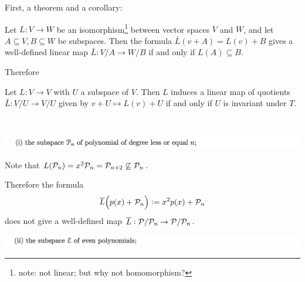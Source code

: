 First, a theorem and a corollary:

\begin{theorem*}
  Let $L:V \to W$ be an isomorphism\footnote{note: not linear; but why not homomorphism?} between
  vector spaces $V$ and $W$, and let $A \subseteq V, B \subseteq W$ be subspaces. Then the formula
  $\bar L(v + A) = L(v) + B$ gives a well-defined linear map $\bar L:V/A \to W/B$ if and only if
  $L(A) \subseteq B$.
\end{theorem*}

Therefore

\begin{corollary*}
  Let $L:V \to V$ with $U$ a subspace of $V$. Then $L$ induces a linear map of quotients
  $\bar L:V/U \to V/U$ given by $v + U \mapsto L(v) + U$ if and only if $U$ is invariant under $T$.
\end{corollary*}

~\\

\begin{mdframed}
  \includegraphics[width=400pt]{img/linear-algebra-a0-2-2-1.png}
\end{mdframed}


Note that $L(\mathcal P_n) = x^2\mathcal P_n = \mathcal P_{n+2} \not\subseteq \mathcal P_n$.

Therefore the formula
\begin{align*}
  \overline L\Big(p(x) + \mathcal P_n\Big) := x^2p(x) + \mathcal P_n
\end{align*}
does not give a well-defined map $\overline L:\mathcal P/\mathcal P_n \to \mathcal P/\mathcal P_n$.

\begin{mdframed}
  \includegraphics[width=400pt]{img/linear-algebra-a0-2-2-2.png}
\end{mdframed}


